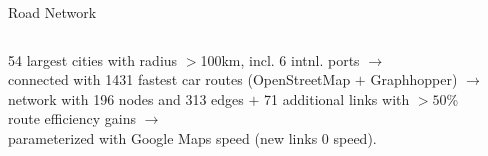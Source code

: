 \documentclass[aspectratio=169,xcolor=dvipsnames]{beamer}
\begin{document}
\begin{frame}{Road Network} \vspace{-3mm}
\begin{adjustbox}{center}
    \begin{columns} \setlength{\columnsep}{1mm} %
        \begin{column}{0.22\textwidth}
\small 54 largest cities with radius $>$100km, incl. 6 intnl. ports $\to$\\\vspace{2mm} connected with 1431 fastest car routes (OpenStreetMap $+$ Graphhopper) $\to$\\\vspace{2mm} network with 196 nodes and 313 edges $+$ 71 additional links with $>50$\% route efficiency gains $\to$\\\vspace{2mm} parameterized with Google Maps speed (new links 0 speed).
        \end{column}
        \begin{column}{0.9\textwidth}
\end{column}
\end{columns}
\end{adjustbox}
\end{frame}
\end{document}
